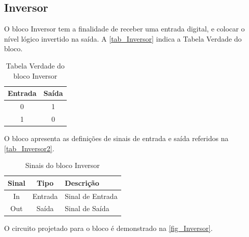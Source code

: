 \newcommand{\NomeBloco}{Inversor}
\newcommand{\NomePTab}{tab_\NomeBloco}
\newcommand{\NomeSTab}{tab_\NomeBloco2}
\newcommand{\NomePFig}{fig_\NomeBloco}
\newcommand{\NomeSFig}{fig_\NomeBloco2}
\newcommand{\NomeTTab}{tab_\NomeBloco3}

\subsection{\NomeBloco}
\label{inversor1}

O bloco \NomeBloco{} tem a finalidade de receber uma entrada digital, e colocar o n\'ivel l\'ogico invertido na sa\'ida. A \autoref{\NomePTab} indica a Tabela Verdade do bloco.

\begin{table}[htbp]

\caption{Tabela Verdade do bloco \NomeBloco}%
\label{\NomePTab}
\centering
\begin{tabular}{cc}
    \toprule
    Entrada & Saída \\
    \midrule \midrule
    0 & 1 \\
    \midrule
    1 & 0 \\
\bottomrule

\end{tabular}
\end{table}

O bloco apresenta as defini{\c c}\~oes de sinais de entrada e sa\'ida referidos na \autoref{\NomeSTab}.

\begin{table}[htbp]
\caption{Sinais do bloco \NomeBloco}
\label{\NomeSTab}
\centering
\begin{tabular}{ccl}

    \toprule
    Sinal & Tipo    & Descri{\c c}\~ao        \\
    \midrule \midrule
    In    & Entrada & Sinal de Entrada \\
    \midrule
    Out   & Saída   & Sinal de Sa\'ida   \\
    \bottomrule
\end{tabular}
\end{table}

O circuito projetado para o bloco \'e demonstrado na \autoref{\NomePFig}.

